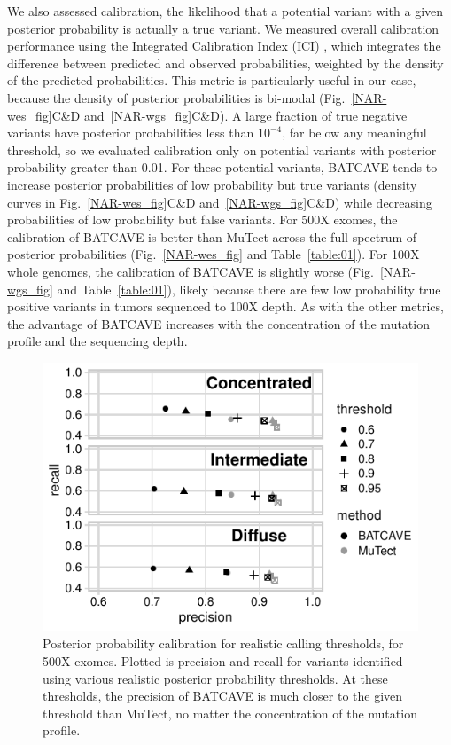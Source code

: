 \documentclass[a4,center,fleqn]{NAR}
\newcommand{\batcave}{BATCAVE\xspace}
\begin{document}
We also assessed calibration, the likelihood that a potential variant with a given posterior probability is actually a true variant.
We measured overall calibration performance using the Integrated Calibration Index (ICI) \cite{Austin2019}, which integrates the difference between predicted and observed probabilities, weighted by the density of the predicted probabilities.
This metric is particularly useful in our case, because the density of posterior probabilities is bi-modal (Fig.~\ref{NAR-wes_fig}C\&D and~\ref{NAR-wgs_fig}C\&D).
A large fraction of true negative variants have posterior probabilities less than $10^{-4}$, far below any meaningful threshold, so we evaluated calibration only on potential variants with posterior probability greater than 0.01.
For these potential variants, \batcave tends to increase posterior probabilities of low probability but true variants (density curves in Fig.~\ref{NAR-wes_fig}C\&D and~\ref{NAR-wgs_fig}C\&D) while decreasing probabilities of low probability but false variants.
For 500X exomes, the calibration of \batcave is better than MuTect across the full spectrum of posterior probabilities (Fig.~\ref{NAR-wes_fig} and Table~\ref{table:01}).
For 100X whole genomes, the calibration of \batcave is slightly worse (Fig.~\ref{NAR-wgs_fig} and Table~\ref{table:01}), likely because there are few low probability true positive variants in tumors sequenced to 100X depth. 
As with the other metrics, the advantage of \batcave increases with the concentration of the mutation profile and the sequencing depth.

\begin{figure}
\centering
  \includegraphics{figures/ppv_wes.pdf}
  \caption{Posterior probability calibration for realistic calling thresholds, for 500X exomes.
  Plotted is precision and recall for variants identified using various realistic posterior probability thresholds.
At these thresholds, the precision of \batcave is much closer to the given threshold than MuTect, no matter the concentration of the mutation profile.
  }
\label{NAR-ppv_fig}
\end{figure}
\end{document}
